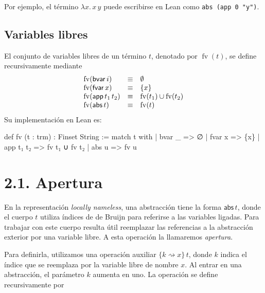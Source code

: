 \documentclass[
  spanish,
  letterpaper,
  DIV=11,
  numbers=noendperiod]{scrreprt}
\newenvironment{Shaded}{\begin{snugshade}}{\end{snugshade}}
\newcommand{\KeywordTok}[1]{\textcolor[rgb]{0.00,0.23,0.31}{\textbf{#1}}}
\newcommand{\NormalTok}[1]{\textcolor[rgb]{0.00,0.23,0.31}{#1}}
\renewcommand{\NormalTok}[1]{\textcolor[HTML]{000000}{#1}}
\renewcommand{\KeywordTok}[1]{\textcolor[HTML]{0000FF}{#1}}
\theoremstyle{remark}
\begin{document}
Por ejemplo, el término \(\lambda x. \, x \, y\) puede escribirse en
Lean como \texttt{abs\ (app\ 0\ "y")}.

\subsection{Variables libres}\label{variables-libres}

El conjunto de variables libres de un término \(t\), denotado por
\(\operatorname{fv} (t)\), se define recursivamente mediante \[
\begin{array}{l c l}
\operatorname{fv}(\mathsf{bvar}\, i) & \equiv & \emptyset \\ 
\operatorname{fv}(\mathsf{fvar}\, x) & \equiv & \{x\} \\ 
\operatorname{fv}(\mathsf{app}\, t_1\, t_2) & \equiv & \operatorname{fv}(t_1) \cup \operatorname{fv}(t_2) \\ 
\operatorname{fv}(\mathsf{abs}\, t) & \equiv & \operatorname{fv}(t)
\end{array}
\] Su implementación en Lean es:

\begin{Shaded}
\begin{Highlighting}[]
\KeywordTok{def}\NormalTok{ fv (t : trm) : Finset String :=}
  \KeywordTok{match}\NormalTok{ t }\KeywordTok{with}
\NormalTok{  | bvar \_    =\textgreater{} ∅}
\NormalTok{  | fvar x    =\textgreater{} \{x\}}
\NormalTok{  | app t₁ t₂ =\textgreater{} fv t₁ ∪ fv t₂}
\NormalTok{  | abs u     =\textgreater{} fv u}
\end{Highlighting}
\end{Shaded}

\section{2.1. Apertura}\label{apertura}

En la representación \emph{locally nameless}, una abstracción tiene la
forma \(\mathsf{abs} \, t\), donde el cuerpo \(t\) utiliza índices de de
Bruijn para referirse a las variables ligadas. Para trabajar con este
cuerpo resulta útil reemplazar las referencias a la abstracción exterior
por una variable libre. A esta operación la llamaremos \emph{apertura}.

Para definirla, utilizamos una operación auxiliar
\(\{k\rightsquigarrow x\}\,t\), donde \(k\) indica el índice que se
reemplaza por la variable libre de nombre \(x\). Al entrar en una
abstracción, el parámetro \(k\) aumenta en uno. La operación se define
recursivamente por
\end{document}
